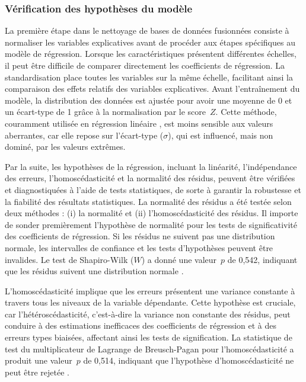 \begin{refsegment}
\subsubsection*{Vérification des hypothèses du modèle
    \label{chap4:methodologie-hypotheses}
    }

La première étape dans le nettoyage de bases de données fusionnées consiste à normaliser les variables explicatives avant de procéder aux étapes spécifiques au modèle de régression. Lorsque les caractéristiques présentent différentes échelles, il peut être difficile de comparer directement les coefficients de régression. La standardisation place toutes les variables sur la même échelle, facilitant ainsi la comparaison des effets relatifs des variables explicatives. Avant l'entraînement du modèle, la distribution des données est ajustée pour avoir une moyenne de 0 et un écart-type de 1 grâce à la normalisation par le score~\(Z\). Cette méthode, couramment utilisée en régression linéaire \textcolor{blue}{\autocite{pearson_lines_1901}}, est moins sensible aux valeurs aberrantes, car elle repose sur l'écart-type ($\sigma$), qui est influencé, mais non dominé, par les valeurs extrêmes.%

Par la suite, les hypothèses de la régression, incluant la linéarité, l'indépendance des erreurs, l'homoscédasticité et la normalité des résidus, peuvent être vérifiées et diagnostiquées à l'aide de tests statistiques, de sorte à garantir la robustesse et la fiabilité des résultats statistiques. La normalité des résidus a été testée selon deux méthodes : (i) la normalité et (ii) l'homoscédasticité des résidus. Il importe de sonder premièrement l'hypothèse de normalité pour les tests de significativité des coefficients de régression. Si les résidus ne suivent pas une distribution normale, les intervalles de confiance et les tests d'hypothèses peuvent être invalides. Le test de Shapiro-Wilk (\(W\)) a donné une valeur~$p$ de 0,542, indiquant que les résidus suivent une distribution normale \textcolor{blue}{\autocite{shapiro_analysis_1965}}.%

L'homoscédasticité implique que les erreurs présentent une variance constante à travers tous les niveaux de la variable dépendante. Cette hypothèse est cruciale, car l'hétéroscédasticité, c'est-à-dire la variance non constante des résidus, peut conduire à des estimations inefficaces des coefficients de régression et à des erreurs types biaisées, affectant ainsi les tests de signification. La statistique de test du multiplicateur de Lagrange de Breusch-Pagan pour l'homoscédasticité a produit une valeur~$p$ de 0,514, indiquant que l'hypothèse d'homoscédasticité ne peut être rejetée \textcolor{blue}{\autocite{breusch_simple_1979}}.%


\end{refsegment}
